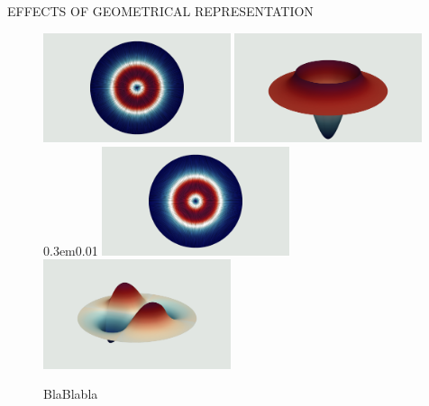 \documentclass[final]{beamer} %
\def\vspace{0.3em}{ }%
\begin{document}
\begin{frame}
\begin{columns}
\begin{column}{0.45\textwidth}
{\begin{block}{\boxnumber EFFECTS OF GEOMETRICAL REPRESENTATION}
\begin{figure}[hb]
\begin{mdframed}[backgroundcolor=bggrey]
	            \includegraphics[width=0.49\textwidth]{images/et2posterStepFiber.png}%
	            \hspace{0.01\textwidth}%
	            \includegraphics[width=0.49\textwidth]{images/ez2posterStepFiber.png}
	            \vspace{0.01\textwidth}
	            \includegraphics[width=0.49\textwidth]{images/et3posterStepFiber.png}%
	            \hspace{0.01\textwidth}%
	            \includegraphics[width=0.49\textwidth]{images/ez3posterStepFiber.png}
	            \end{mdframed}
            \caption{BlaBlabla}
        \end{figure}
        \end{block}

        \vfill

      } %
    \end{column}


\end{columns}
\end{frame}
\end{document}
